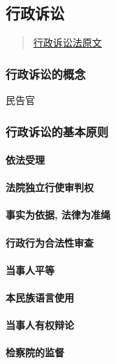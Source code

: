 \subsection{行政诉讼}

\begin{quote}
	\href{https://www.gov.cn/flfg/2006-10/29/content_1499268.htm}{行政诉讼法原文}
\end{quote}

\subsubsection{行政诉讼的概念} 民告官

\subsubsection{行政诉讼的基本原则}

\paragraph{依法受理}

\paragraph{法院独立行使审判权}

\paragraph{事实为依据, 法律为准绳}

\paragraph{行政行为合法性审查}

\paragraph{当事人平等}

\paragraph{本民族语言使用}

\paragraph{当事人有权辩论}

\paragraph{检察院的监督}

